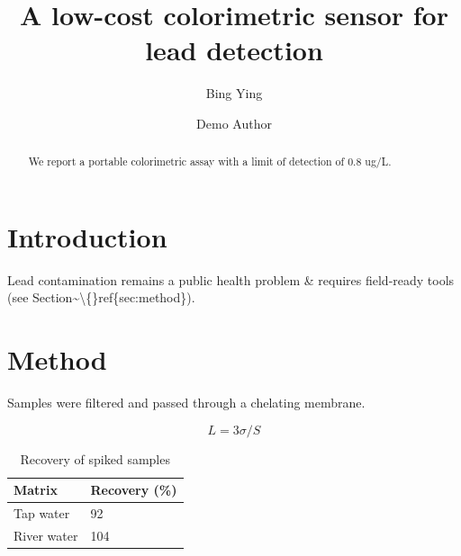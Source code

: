 \documentclass[11pt]{article}
\title{A low-cost colorimetric sensor for lead detection}
\author{Bing Ying \and Demo Author}
\date{}
\begin{document}
\maketitle

\begin{abstract}
We report a portable colorimetric assay with a limit of detection of 0.8 ug/L.
\end{abstract}

\section{Introduction}
\label{sec:intro}

Lead contamination remains a public health problem \& requires field-ready tools (see Section\textasciitilde{}\textbackslash\{\}ref\{sec:method\}).

\section{Method}
\label{sec:method}

Samples were filtered and passed through a chelating membrane.

\begin{equation}
L = 3\sigma / S
\end{equation}

\begin{table}[htbp]
\centering
\caption{Recovery of spiked samples}
\begin{tabular}{ll}
\toprule
Matrix & Recovery (\%) \\
\midrule
Tap water & 92 \\
River water & 104 \\
\bottomrule
\end{tabular}
\end{table}



\end{document}
